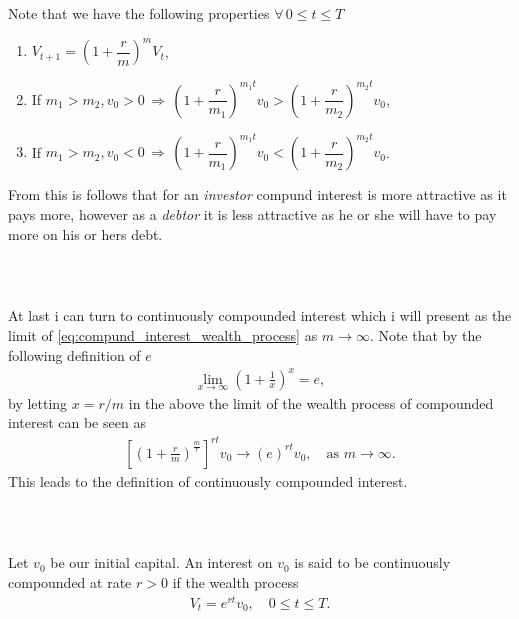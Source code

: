 \documentclass{beamer}
\numberwithin{equation}{section}
\begin{document}
\begin{frame}\frametitle{{\normalsize \secname} \\ {\large \subsecname}}
    Note that we have the following properties $\forall\, 0 \leq t \leq T$
    \begin{enumerate}
        \item $V_{t + 1} = \left( 1 + \dfrac{r}{m} \right)^{m}V_t$,
        \item If $m_1 > m_2, v_0 > 0 
        \, \Rightarrow \, 
        \left( 1 + \dfrac{r}{m_1} \right)^{m_1t}v_0
        >
        \left( 1 + \dfrac{r}{m_2} \right)^{m_2t}v_0$,
        \item If $m_1 > m_2, v_0 < 0 
        \, \Rightarrow \, 
        \left( 1 + \dfrac{r}{m_1} \right)^{m_1t}v_0
        <
        \left( 1 + \dfrac{r}{m_2} \right)^{m_2t}v_0$.
    \end{enumerate}
    From this is follows that for an \textit{investor} compund interest is more attractive as it pays more, however as a \textit{debtor} it is less attractive as he or she will have to pay more on his or hers debt.
\end{frame}

\begin{frame}\frametitle{{\normalsize \secname} \\ {\large \subsecname}}
    At last i can turn to continuously compounded interest which i will present as the limit of \eqref{eq:compund_interest_wealth_process} as $m \rightarrow \infty$.
    Note that by the following definition of $e$
    \begin{align}
        \lim_{x \rightarrow \infty} \left(1 + \frac{1}{x}\right)^x = e,
    \end{align}
    by letting $x = r/m$ in the above the limit of the wealth process of compounded interest can be seen as
    \begin{align}
        \left[\left( 1 + \frac{r}{m} \right)^\frac{m}{r}\right]^{rt}v_0 \rightarrow
        (e)^{rt}v_0, \quad \text{as } m \rightarrow \infty.
    \end{align} 
    This leads to the definition of continuously compounded interest.
\end{frame}

\begin{frame}\frametitle{{\normalsize \secname} \\ {\large \subsecname}}
    \begin{definition}
        Let $v_0$ be our initial capital.
        An interest on $v_0$ is said to be continuously compounded at rate $r>0$ if the wealth process
        \begin{align}
            V_t = e^{rt}v_0, \quad 0 \leq t \leq T.
        \end{align}
    \end{definition}
\end{frame}
\end{document}

